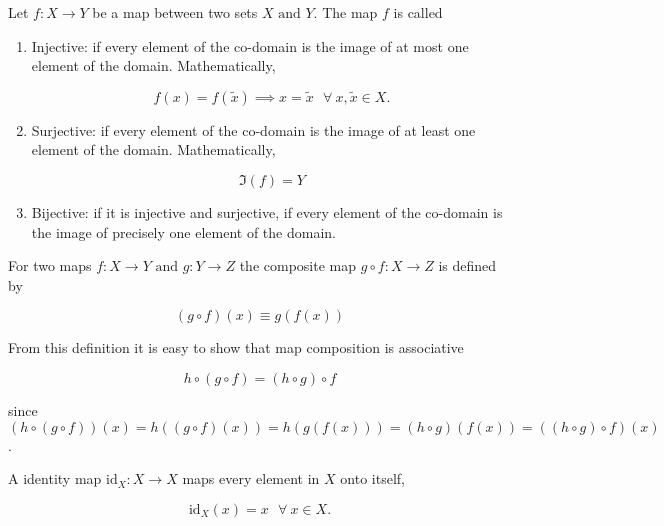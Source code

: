 \documentclass[a4paper,12pt]{report}
\begin{document}
\begin{definition}
Let \(f:X \rightarrow Y\) be a map between two sets \(X \text { and } Y\). The map \(f\) is called

\begin{enumerate}
    \item Injective: if every element of the co-domain is the image of at most one element of the domain. Mathematically,
    
    \begin{equation}
        f(x) = f(\tilde{x} ) \implies x = \tilde{x} ~~~ \forall ~ x,\tilde{x} \in X.
    \end{equation}

    \item Surjective: if every element of the co-domain is the image of at least one element of the domain. Mathematically,
    
    \begin{equation}
        \Im (f) = Y
    \end{equation}
    
    \item Bijective: if it is injective and surjective, \ie if every element of the co-domain is the image of precisely one element of the domain.
   
\end{enumerate}

\end{definition}

\begin{definition}
For two maps \(f:X \rightarrow Y \text { and } g: Y \rightarrow Z\) the composite map  \(g \circ f: X \rightarrow Z\) is defined by

\begin{equation}
    (g \circ f)(x) \equiv g(f(x))
\end{equation}

\end{definition}

From this definition it is easy to show that map composition is associative

\begin{equation}
    h \circ (g \circ  f) = (h \circ  g) \circ f
\end{equation}

since \((h \circ (g \circ f))(x) = h((g \circ f)(x)) = h(g(f(x))) = (h \circ g)(f(x)) = ((h \circ g) \circ f)(x)\).

\begin{definition}
A identity map \(\mathrm{id}_{X} : X \rightarrow X\)  maps every element in \(X\) onto itself, \ie 

\begin{equation}
    \mathrm{id}_{X} (x) = x ~~~  \forall ~ x \in  X.
\end{equation}
\end{definition}
\end{document}
